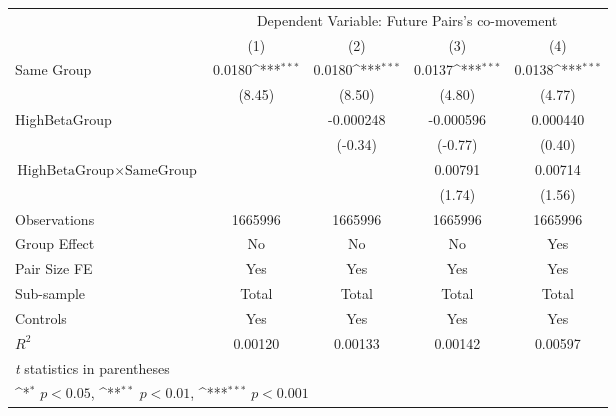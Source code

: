 {
\def\sym#1{\ifmmode^{#1}\else\(^{#1}\)\fi}
\begin{tabular}{l*{4}{c}}
\hline\hline
                &\multicolumn{4}{c}{Dependent Variable: Future Pairs's co-movement}         \\\cmidrule(lr){2-5}
                &\multicolumn{1}{c}{(1)}         &\multicolumn{1}{c}{(2)}         &\multicolumn{1}{c}{(3)}         &\multicolumn{1}{c}{(4)}         \\
\hline
Same Group      &   0.0180\sym{***}&   0.0180\sym{***}&   0.0137\sym{***}&   0.0138\sym{***}\\
                &   (8.45)         &   (8.50)         &   (4.80)         &   (4.77)         \\
[1em]
HighBetaGroup   &                  &-0.000248         &-0.000596         & 0.000440         \\
                &                  &  (-0.34)         &  (-0.77)         &   (0.40)         \\
[1em]
$ {\text{HighBetaGroup} } \times {\text{SameGroup} }  $ &                  &                  &  0.00791         &  0.00714         \\
                &                  &                  &   (1.74)         &   (1.56)         \\
\hline
Observations    &  1665996         &  1665996         &  1665996         &  1665996         \\
Group Effect    &       No         &       No         &       No         &      Yes         \\
Pair Size FE    &      Yes         &      Yes         &      Yes         &      Yes         \\
Sub-sample      &    Total         &    Total         &    Total         &    Total         \\
Controls        &      Yes         &      Yes         &      Yes         &      Yes         \\
$ R^2 $         &  0.00120         &  0.00133         &  0.00142         &  0.00597         \\
\hline\hline
\multicolumn{5}{l}{\footnotesize \textit{t} statistics in parentheses}\\
\multicolumn{5}{l}{\footnotesize \sym{*} \(p<0.05\), \sym{**} \(p<0.01\), \sym{***} \(p<0.001\)}\\
\end{tabular}
}
